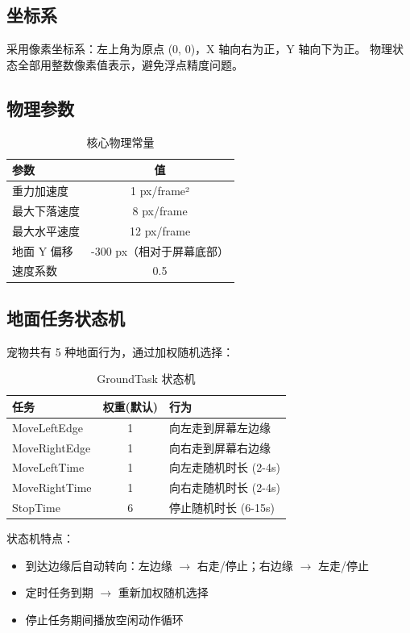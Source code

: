 \documentclass[12pt,a4paper]{ctexart}
\begin{document}
\subsection{坐标系}

采用像素坐标系：左上角为原点 (0, 0)，X 轴向右为正，Y 轴向下为正。
物理状态全部用整数像素值表示，避免浮点精度问题。

\subsection{物理参数}

\begin{table}[H]
\centering
\caption{核心物理常量}
\label{tab:physics}
\begin{tabular}{lc}
\toprule
\textbf{参数} & \textbf{值} \\
\midrule
重力加速度 & 1 px/frame² \\
最大下落速度 & 8 px/frame \\
最大水平速度 & 12 px/frame \\
地面 Y 偏移 & -300 px（相对于屏幕底部） \\
速度系数 & 0.5 \\
\bottomrule
\end{tabular}
\end{table}

\subsection{地面任务状态机}

宠物共有 5 种地面行为，通过加权随机选择：

\begin{table}[H]
\centering
\caption{GroundTask 状态机}
\label{tab:tasks}
\begin{tabular}{lcl}
\toprule
\textbf{任务} & \textbf{权重(默认)} & \textbf{行为} \\
\midrule
MoveLeftEdge  & 1   & 向左走到屏幕左边缘 \\
MoveRightEdge & 1   & 向右走到屏幕右边缘 \\
MoveLeftTime  & 1   & 向左走随机时长 (2-4s) \\
MoveRightTime & 1   & 向右走随机时长 (2-4s) \\
StopTime      & 6   & 停止随机时长 (6-15s) \\
\bottomrule
\end{tabular}
\end{table}

状态机特点：
\begin{itemize}
    \item 到达边缘后自动转向：左边缘 $\to$ 右走/停止；右边缘 $\to$ 左走/停止
    \item 定时任务到期 $\to$ 重新加权随机选择
    \item 停止任务期间播放空闲动作循环
\end{itemize}
\end{document}
